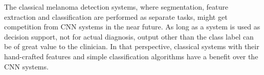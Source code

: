 \documentclass[a4paper,12pt]{article}
\begin{document}

The classical melanoma detection systems, where segmentation, feature extraction and classification are performed as separate tasks, might get competition from CNN systems in the near future.
As long as a system is used as decision support, not for actual diagnosis, output other than the class label can be of great value to the clinician. 
In that perspective, classical systems with their hand-crafted features and simple classification algorithms have a benefit over the CNN systems. 








\end{document}
